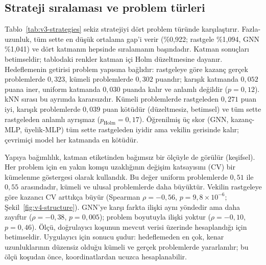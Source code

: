 \documentclass[pdflatex,sn-basic]{sn-jnl}
\begin{document}
\subsection{Strateji sıralaması ve problem türleri}\label{sec:bulgular-katman}

Tablo~\ref{tab:v3-strategies} sekiz stratejiyi dört problem türünde karşılaştırır. Fazla-uzunluk,
tüm sette en düşük ortalama gap'i verir (\%0,922; rastgele \%1,094, GNN \%1,041) ve dört katmanın
hepsinde sıralamanın başındadır.
Katman sonuçları betimseldir; tablodaki renkler katman içi Holm düzeltmesine dayanır. Hedeflemenin getirisi problem
yapısına bağlıdır: rastgeleye göre kazanç gerçek problemlerde $0{,}323$, kümeli problemlerde
$0{,}302$ puandır; karışık katmanda $0{,}052$ puana iner, uniform katmanda $0{,}030$ puanda kalır ve
anlamlı değildir ($p=0{,}12$).
kNN sırası bu ayrımda kararsızdır. Kümeli problemlerde rastgeleden $0{,}271$ puan iyi, karışık
problemlerde $0{,}039$ puan kötüdür (düzeltmesiz, betimsel) ve tüm sette rastgeleden anlamlı ayrışmaz
($p_{\mathrm{Holm}}=0{,}17$).
Öğrenilmiş üç skor (GNN, kazanç-MLP, üyelik-MLP) tüm sette rastgeleden iyidir ama vekilin gerisinde
kalır; çevrimiçi model her katmanda en kötüdür.

Yapıya bağımlılık, katman etiketinden bağımsız bir ölçüyle de görülür (keşifsel). Her problem için
en yakın komşu uzaklığının değişim katsayısını (CV) bir kümelenme göstergesi olarak kullandık. Bu
değer uniform problemlerde $0{,}51$ ile $0{,}55$ arasındadır, kümeli ve ulusal problemlerde daha
büyüktür.
Vekilin rastgeleye göre kazancı CV arttıkça büyür (Spearman $\rho=-0{,}56$, $p=9{,}8\times10^{-6}$;
Şekil~\ref{fig:v4-structure}). GNN'ye karşı farkta ilişki aynı yöndedir ama daha zayıftır
($\rho=-0{,}38$, $p=0{,}005$); problem boyutuyla ilişki yoktur ($\rho=-0{,}10$, $p=0{,}46$).
Ölçü, doğrulayıcı koşunun mevcut verisi üzerinde hesaplandığı için betimseldir. Uygulayıcı için
sonucu şudur: hedeflemeden en çok, kenar uzunluklarının düzensiz olduğu kümeli ve gerçek problemlerde
yararlanılır; bu ölçü koşudan önce, koordinatlardan ucuzca hesaplanabilir.
\end{document}
